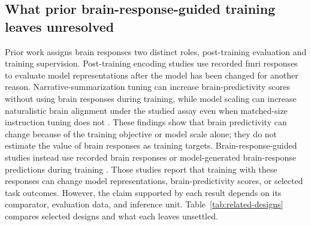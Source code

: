 \subsection{What prior brain-response-guided training leaves unresolved}
\label{sec:prior-gap}

Prior work assigns brain responses two distinct roles, post-training evaluation and training supervision.
Post-training encoding studies use recorded \ac{fmri} responses to evaluate model representations after the model has been changed for another reason.
Narrative-summarization tuning can increase brain-predictivity scores without using brain responses during training, while model scaling can increase naturalistic brain alignment under the studied assay even when matched-size instruction tuning does not \autocite{aw2023,gao2024}.
These findings show that brain predictivity can change because of the training objective or model scale alone; they do not estimate the value of brain responses as training targets.
Brain-response-guided studies instead use recorded brain responses or model-generated brain-response predictions during training \autocite{moussa2025,negi2025,merlinData2026,vaidya2026}.
Those studies report that training with these responses can change model representations, brain-predictivity scores, or selected task outcomes.
However, the claim supported by each result depends on its comparator, evaluation data, and inference unit.
Table~\ref{tab:related-designs} compares selected designs and what each leaves unsettled.

